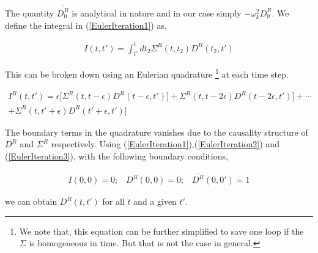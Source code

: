 \documentclass{amsart}
\begin{document}
     The quantity $\overline{\overline{D^R_0}}$ is analytical in nature and in our case simply $-\omega_k^2D^R_0$.
    We define the integral in (\ref{EulerIteration1}) as,
    
    \begin{align}
        I(t,t')=\int^{t}_{t'} dt_2 \Sigma^R (t,t_2) D^R(t_2, t')
    \end{align}
    
     This can be broken down using an Eulerian quadrature    
    \footnote{We note that, this equation can be further simplified to save one loop if the $\Sigma$ is homogeneous in time. But that is not the case in general.} at each time step.
    
    \begin{multline}\label{EulerIteration3}
         I^R(t,t')=\epsilon\big[\Sigma^R (t,t-\epsilon) D^R(t-\epsilon, t')\big]+\Sigma^R (t,t-2\epsilon) D^R(t-2\epsilon, t')\big]+\cdots
        \\  +\Sigma^R (t,t'+\epsilon) D^R(t'+\epsilon, t')\big]
    \end{multline}
    
     The boundary terms in the quadrature vanishes due to the causality structure of $D^R$ and $\Sigma^R$ respectively.
 Using (\ref{EulerIteration1}),(\ref{EulerIteration2}) and (\ref{EulerIteration3}), with the following boundary conditions,
    
    \begin{align}\label{BoundaryCondition1}
        I(0,0)=0; \;\;\; D^R(0,0)=0; \;\;\; \overline{D^R}(0,0')=1
    \end{align}
    
    we can obtain $D^R(t,t')$ for all $t$ and a given $t'$. 
    
\end{document}
